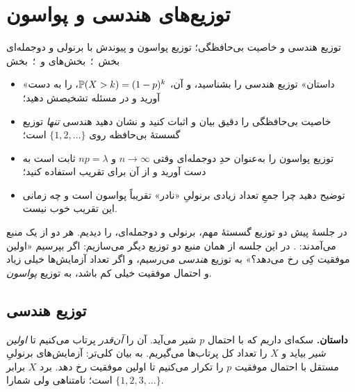 \chapter{توزیع‌های هندسی و پواسون}
\label{ch:s6}

\providecommand{\stems}[2]{%
  \edef\stemlist{#2}%
  \foreach \k/\p in \stemlist {
    \draw[#1, line width=1.5pt] (\k,0) -- (\k,\p);
    \fill[#1] (\k,\p) circle (1.7pt);
  }}

{توزیع هندسی و خاصیت بی‌حافظگی؛ توزیع پواسون و پیوندش با برنولی و دوجمله‌ای}
{ بخش  \,؛\,  بخش‌های  و  \,؛\,  بخش }
{\begin{itemize}
  \item «داستان» توزیع هندسی را بشناسید،  و  آن، $\P(X>k)=(1-p)^k$، را به دست آورید و در مسئله تشخیصش دهید؛
  \item خاصیت بی‌حافظگی را دقیق بیان و اثبات کنید و نشان دهید هندسی \emph{تنها} توزیع گسستهٔ بی‌حافظه روی $\{1,2,\dots\}$ است؛
  \item توزیع پواسون را به‌عنوان حدِ دوجمله‌ای وقتی $n\to\infty$ و $np=\lambda$ ثابت است به دست آورید و از آن برای تقریب استفاده کنید؛
  \item توضیح دهید چرا جمعِ تعداد زیادی برنولیِ «نادر» تقریباً پواسون است و چه زمانی این تقریب خوب نیست.
\end{itemize}}

در جلسهٔ پیش دو توزیع گسستهٔ مهم، برنولی و دوجمله‌ای، را دیدیم. هر دو از یک منبع می‌آمدند: . در این جلسه از همان منبع دو توزیع دیگر می‌سازیم: اگر بپرسیم «اولین موفقیت کِی رخ می‌دهد؟» به توزیع \emph{هندسی} می‌رسیم، و اگر تعداد آزمایش‌ها خیلی زیاد و احتمال موفقیت خیلی کم باشد، به توزیع \emph{پواسون}.

\section{توزیع هندسی}
\label{sec:geom}

\textbf{داستان.} سکه‌ای داریم که با احتمال $p$ شیر می‌آید. آن را \emph{آن‌قدر} پرتاب می‌کنیم تا \emph{اولین شیر} بیاید و $X$ را تعداد کل پرتاب‌ها می‌گیریم. به بیان کلی‌تر: آزمایش‌های برنولیِ مستقل با احتمال موفقیت $p$ را تکرار می‌کنیم تا اولین موفقیت رخ دهد. برد $X$ برابر $\{1,2,3,\dots\}$ است؛ نامتناهی ولی شمارا.

